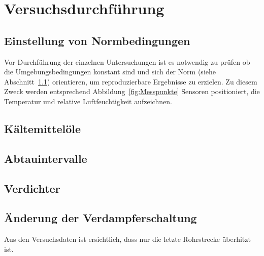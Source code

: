 \chapter{Versuchsdurchführung}
\label{cha:Versuchsdurchführung}

\section{Einstellung von Normbedingungen}
\label{sec:Einstellung von Normbedingungen}

Vor Durchführung der einzelnen Untersuchungen ist es notwendig zu prüfen ob die Umgebungsbedingungen konstant sind und sich der Norm (siehe Abschnitt~\ref{sec:Einstellung von Normbedingungen}) orientieren, um reproduzierbare Ergebnisse zu erzielen. Zu diesem Zweck werden entsprechend Abbildung~\ref{fig:Messpunkte} Sensoren positioniert, die Temperatur und relative Luftfeuchtigkeit aufzeichnen. 

\section{Kältemittelöle}
\label{sec:Kältemitteloele}

\section{Abtauintervalle}
\label{sec:Abtauintervalle}

\section{Verdichter}
\label{sec:Verdichter}

\section{Änderung der Verdampferschaltung}
\label{sec:Änderung der Verdampferschaltung}















Aus den Versuchsdaten ist ersichtlich, dass nur die letzte Rohrstrecke überhitzt ist.

